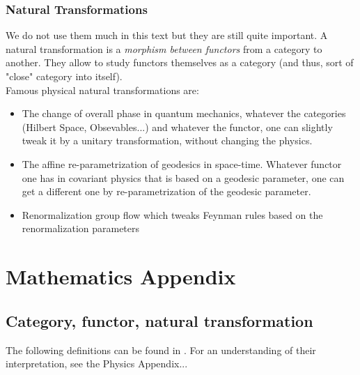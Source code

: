 \documentclass[a4paper,11pt]{article}
\numberwithin{equation}{section}
\theoremstyle{definition}
\begin{document}
    \subsubsection{Natural Transformations}
    We do not use them much in this \color{red} text \color{black} but they are still quite important. A natural transformation is a \emph{morphism between functors} from a category to another. They allow to study functors themselves as a category (and thus, sort of "close" category into itself).\\
    Famous physical natural transformations are:
    \begin{itemize}
        \item The change of overall phase in quantum mechanics, whatever the categories (Hilbert Space, Obsevables...) and whatever the functor, one can slightly tweak it by a unitary transformation, without changing the physics.
        \item The affine re-parametrization of geodesics in space-time. Whatever functor one has in covariant physics that is based on a geodesic parameter, one can get a different one by re-parametrization of the geodesic parameter.
        \item Renormalization group flow which tweaks Feynman rules based on the renormalization parameters
    \end{itemize}
    
    
\newpage
\section{Mathematics Appendix}
    \subsection{Category, functor, natural transformation}
    The following definitions can be found in \cite{AlgLang}. For an understanding of their interpretation, see the Physics Appendix...
\end{document}
